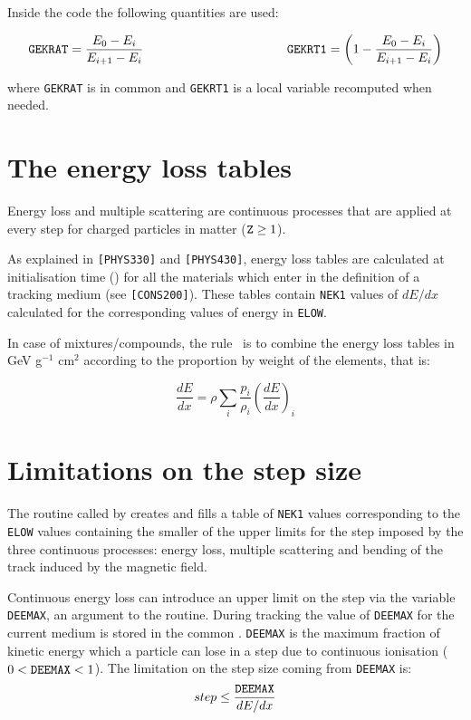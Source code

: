 Inside the code the following quantities are used:

\[
\mbox{\tt GEKRAT} = 
\frac{E_0-E_i}{E_{i+1}-E_i} \hspace{4cm}
\mbox{\tt GEKRT1}  =  
\left ( 1 - \frac{E_0-E_i}{E_{i+1}-E_i} \right )
\]

where {\tt GEKRAT} is in common  and {\tt GEKRT1} 
is a local variable recomputed when needed.

\section {The energy loss tables}
 
Energy loss and multiple
scattering are continuous processes that are applied at every step for
charged particles in matter ($\mbox{\tt Z} \geq 1$). 
 
As explained in {\tt [PHYS330]} and {\tt [PHYS430]},
energy loss tables are calculated at
initialisation time () for all the materials which
enter in the definition of a tracking medium (see {\tt [CONS200]}).
These tables contain {\tt NEK1}
values of $dE/dx$ calculated for the corresponding values of energy
in {\tt ELOW}.
 
In case of mixtures/compounds, the rule~\cite{bib-PDGD} is to combine
the energy loss tables in GeV g$^{-1}$ cm$^{2}$ according to
the proportion by weight of the elements, that is:

\[
\frac{dE}{dx} = \rho \sum_{i}{\frac{p_{i}}{\rho_{i}} \left (
\frac{dE}{dx} \right )_{i}}
\]

\section{Limitations on the step size}
The routine  called by  creates and fills
a table of {\tt NEK1} values corresponding to the {\tt ELOW} values 
containing the smaller of the upper limits for the step 
imposed by the three continuous processes: energy
loss, multiple scattering and bending of the track induced by
the magnetic field.
 
Continuous energy loss can introduce an upper limit on the step via the
variable {\tt DEEMAX}, an argument to the  routine. During 
tracking the value of {\tt DEEMAX} for the current medium is stored in 
the common . {\tt DEEMAX} is the maximum fraction of 
kinetic energy which a particle can lose in a step due to continuous 
ionisation ($0<\mbox{\tt DEEMAX}<1$). 
The limitation on the step size coming from {\tt DEEMAX} is:
\[ 
step \leq \frac{\mbox{\tt DEEMAX}}{dE/dx}
\]
 
